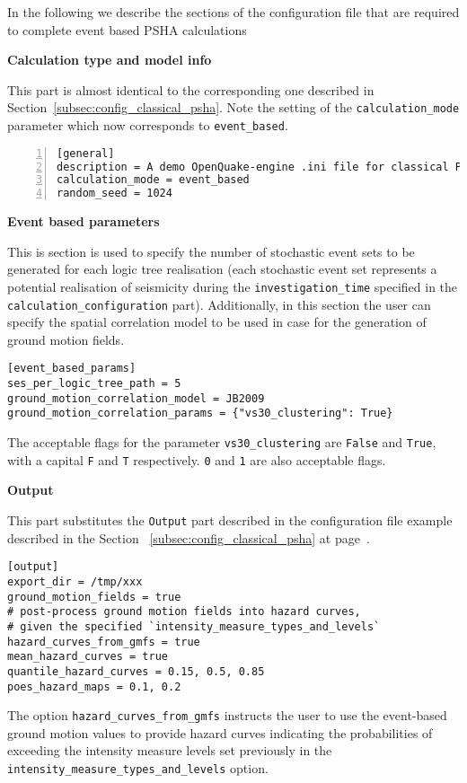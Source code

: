 In the following we describe the sections of the configuration file that are
required to complete event based PSHA calculations


\textbf{Calculation type and model info}

This part is almost identical to the corresponding one described in
Section~\ref{subsec:config_classical_psha}. Note the setting of the
\texttt{calculation\_mode} parameter which now corresponds to
\texttt{event\_based}.

\begin{Verbatim}[frame=single, commandchars=\\\{\}, fontsize=\small,
    numbers=left, numbersep=2pt]
[general]
description = A demo OpenQuake-engine .ini file for classical PSHA
calculation_mode = event_based
random_seed = 1024
\end{Verbatim}



\textbf{Event based parameters}

This is section is used to specify the number of stochastic event sets to be
generated for each logic tree realisation  (each stochastic event set
represents a potential realisation of seismicity during the
\texttt{investigation\_time} specified in the
\texttt{calculation\_configuration} part). Additionally, in this section the
user can specify the spatial correlation model to be used in case for the
generation of ground motion fields.

\begin{Verbatim}[frame=single, commandchars=\\\{\}, fontsize=\small]
[event_based_params]
ses_per_logic_tree_path = 5
ground_motion_correlation_model = JB2009
ground_motion_correlation_params = {"vs30_clustering": True}
\end{Verbatim}

The acceptable flags for the parameter \verb+vs30_clustering+ are \verb+False+
and \verb+True+, with a capital \verb+F+ and \verb+T+ respectively. \verb+0+
and \verb+1+ are also acceptable flags.



\textbf{Output}

This part substitutes the \texttt{Output} part described in  the configuration
file example described in the Section~ \ref{subsec:config_classical_psha} at
page~\pageref{subsec:config_classical_psha}.

\begin{Verbatim}[frame=single, commandchars=\\\{\}, fontsize=\small]
[output]
export_dir = /tmp/xxx
ground_motion_fields = true
# post-process ground motion fields into hazard curves,
# given the specified `intensity_measure_types_and_levels`
hazard_curves_from_gmfs = true
mean_hazard_curves = true
quantile_hazard_curves = 0.15, 0.5, 0.85
poes_hazard_maps = 0.1, 0.2
\end{Verbatim}

The option \verb=hazard_curves_from_gmfs= instructs the user to use the event-based ground motion values to provide hazard curves indicating the probabilities of exceeding the intensity measure levels set previously in the \verb=intensity_measure_types_and_levels= option.
